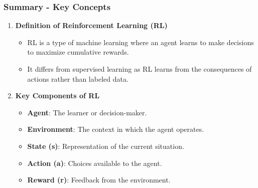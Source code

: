 \documentclass[aspectratio=169]{beamer}
\begin{document}
\begin{frame}[fragile]
    \frametitle{Summary - Key Concepts}
    \begin{enumerate}
        \item \textbf{Definition of Reinforcement Learning (RL)} 
            \begin{itemize}
                \item RL is a type of machine learning where an agent learns to make decisions to maximize cumulative rewards.
                \item It differs from supervised learning as RL learns from the consequences of actions rather than labeled data.
            \end{itemize}
        
        \item \textbf{Key Components of RL}
            \begin{itemize}
                \item \textbf{Agent}: The learner or decision-maker.
                \item \textbf{Environment}: The context in which the agent operates.
                \item \textbf{State (s)}: Representation of the current situation.
                \item \textbf{Action (a)}: Choices available to the agent.
                \item \textbf{Reward (r)}: Feedback from the environment.
            \end{itemize}
    \end{enumerate}
\end{frame}
\end{document}
